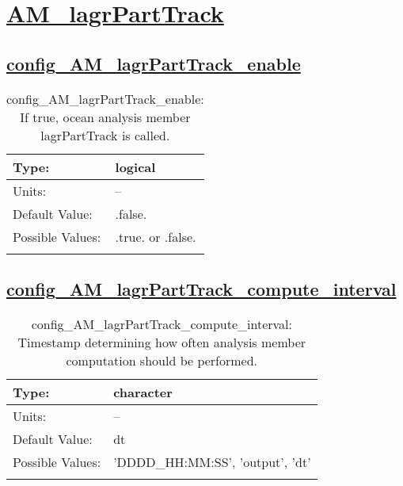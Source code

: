 \section[AM\_lagrPartTrack]{\hyperref[sec:nm_tab_AM_lagrPartTrack]{AM\_lagrPartTrack}}
\label{sec:nm_sec_AM_lagrPartTrack}
\subsection[config\_AM\_lagrPartTrack\_enable]{\hyperref[sec:nm_tab_AM_lagrPartTrack]{config\_AM\_lagrPartTrack\_enable}}
\label{subsec:nm_sec_config_AM_lagrPartTrack_enable}
\begin{center}
\begin{longtable}{| p{2.0in} || p{4.0in} |}
    \hline
    Type: & logical \\
    \hline
    Units: & -- \\
    \hline
    Default Value: & .false. \\
    \hline
    Possible Values: & .true. or .false. \\
    \hline
    \caption{config\_AM\_lagrPartTrack\_enable: If true, ocean analysis member lagrPartTrack is called.}
\end{longtable}
\end{center}
\subsection[config\_AM\_lagrPartTrack\_compute\_interval]{\hyperref[sec:nm_tab_AM_lagrPartTrack]{config\_AM\_lagrPartTrack\_compute\_interval}}
\label{subsec:nm_sec_config_AM_lagrPartTrack_compute_interval}
\begin{center}
\begin{longtable}{| p{2.0in} || p{4.0in} |}
    \hline
    Type: & character \\
    \hline
    Units: & -- \\
    \hline
    Default Value: & dt \\
    \hline
    Possible Values: & 'DDDD\_HH:MM:SS', 'output', 'dt' \\
    \hline
    \caption{config\_AM\_lagrPartTrack\_compute\_interval: Timestamp determining how often analysis member computation should be performed.}
\end{longtable}
\end{center}
